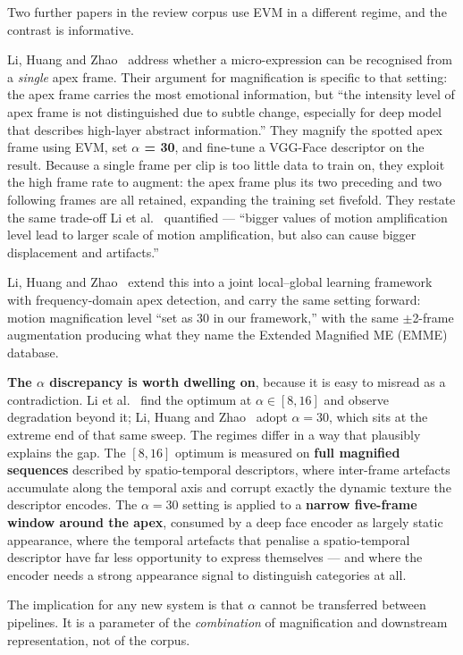 Two further papers in the review corpus use EVM in a different regime, and the contrast is informative.

Li, Huang and Zhao~\cite{liY2018} address whether a micro-expression can be recognised from a \textit{single} apex frame. Their argument for magnification is specific to that setting: the apex frame carries the most emotional information, but ``the intensity level of apex frame is not distinguished due to subtle change, especially for deep model that describes high-layer abstract information.'' They magnify the spotted apex frame using EVM, set \textbf{$\alpha$ = 30}, and fine-tune a VGG-Face descriptor on the result. Because a single frame per clip is too little data to train on, they exploit the high frame rate to augment: the apex frame plus its two preceding and two following frames are all retained, expanding the training set fivefold. They restate the same trade-off Li et al.~\cite{liX2018} quantified --- ``bigger values of motion amplification level lead to larger scale of motion amplification, but also can cause bigger displacement and artifacts.''

Li, Huang and Zhao~\cite{liY2021} extend this into a joint local--global learning framework with frequency-domain apex detection, and carry the same setting forward: motion magnification level ``set as 30 in our framework,'' with the same $\pm$2-frame augmentation producing what they name the Extended Magnified ME (EMME) database.

\textbf{The $\alpha$ discrepancy is worth dwelling on}, because it is easy to misread as a contradiction. Li et al.~\cite{liX2018} find the optimum at $\alpha \in [8, 16]$ and observe degradation beyond it; Li, Huang and Zhao~\cite{liY2018,liY2021} adopt $\alpha = 30$, which sits at the extreme end of that same sweep. The regimes differ in a way that plausibly explains the gap. The $[8, 16]$ optimum is measured on \textbf{full magnified sequences} described by spatio-temporal descriptors, where inter-frame artefacts accumulate along the temporal axis and corrupt exactly the dynamic texture the descriptor encodes. The $\alpha = 30$ setting is applied to a \textbf{narrow five-frame window around the apex}, consumed by a deep face encoder as largely static appearance, where the temporal artefacts that penalise a spatio-temporal descriptor have far less opportunity to express themselves --- and where the encoder needs a strong appearance signal to distinguish categories at all.

The implication for any new system is that $\alpha$ cannot be transferred between pipelines. It is a parameter of the \textit{combination} of magnification and downstream representation, not of the corpus.


